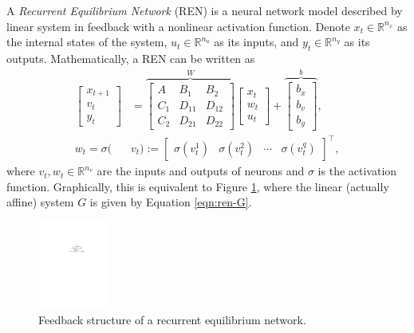 A \textit{Recurrent Equilibrium Network} (REN) is a neural network model described by linear system in feedback with a nonlinear activation function. Denote $x_t \in \mathbb{R}^{n_x}$ as the internal states of the system, $u_t \in\mathbb{R}^{n_u}$ as its inputs, and $y_t \in \mathbb{R}^{n_y}$ as its outputs. Mathematically, a REN can be written as
\begin{align}
    \begin{bmatrix}
        x_{t+1} \\ v_t \\ y_t
    \end{bmatrix}&=
    \overset{W}{\overbrace{
    		\left[
    		\begin{array}{c|cc}
    		A & B_1 & B_2 \\ \hline 
    		C_{1} & D_{11} & D_{12} \\
    		C_{2} & D_{21} & D_{22}
    		\end{array} 
    		\right]
    }}
    \begin{bmatrix}
        x_t \\ w_t \\ u_t
    \end{bmatrix}+
    \overset{b}{\overbrace{
    		\begin{bmatrix}
    		b_x \\ b_v \\ b_y
    		\end{bmatrix}
    }}, \label{eqn:ren-G}\\
    w_t=\sigma(&v_t):=\begin{bmatrix}
    \sigma(v_{t}^1) & \sigma(v_{t}^2) & \cdots & \sigma(v_{t}^q)
    \end{bmatrix}^\top, \label{eqn:ren-sigma}
\end{align}
where $v_t, w_t \in \mathbb{R}^{n_v}$ are the inputs and outputs of neurons and $\sigma$ is the activation function. Graphically, this is equivalent to Figure \ref{fig:ren}, where the linear (actually affine) system $G$ is given by Equation \ref{eqn:ren-G}.

\begin{figure}[h]
    \centering
    \includegraphics[width=0.2\textwidth]{Images/ren.pdf}
    \caption{Feedback structure of a recurrent equilibrium network.}
    \label{fig:ren}
\end{figure}

